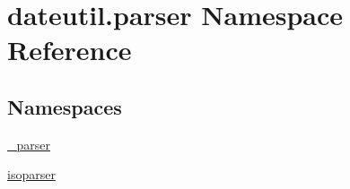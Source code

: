 \hypertarget{namespacedateutil_1_1parser}{}\section{dateutil.\+parser Namespace Reference}
\label{namespacedateutil_1_1parser}
\subsection*{Namespaces}
\begin{DoxyCompactItemize}
\item 
 \hyperlink{namespacedateutil_1_1parser_1_1__parser}{\+\_\+parser}
\item 
 \hyperlink{namespacedateutil_1_1parser_1_1isoparser}{isoparser}
\end{DoxyCompactItemize}
